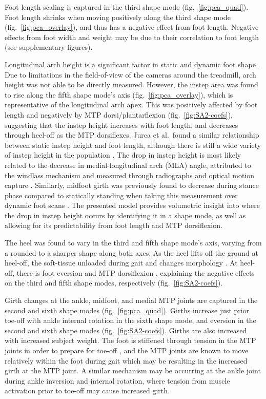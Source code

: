 \documentclass[defaultstyle,11pt]{thesis}
\begin{document}
Foot length scaling is captured in the third shape mode (fig.~\ref{fig:pca_quad}).
Foot length shrinks when moving positively along the third shape mode (fig.~\ref{fig:pca_overlay}), and thus has a negative effect from foot length.
Negative effects from foot width and weight may be due to their correlation to foot length (see supplementary figures).

Longitudinal arch height is a significant factor in static \citep{Stankovic2020, Conrad2019} and dynamic foot shape \citep{Schuster2021} .
Due to limitations in the field-of-view of the cameras around the treadmill, arch height was not able to be directly measured.
However, the instep area was found to rise along the fifth shape mode's axis (fig.~\ref{fig:pca_overlay}), which is representative of the longitudinal arch apex.
This was positively affected by foot length and negatively by MTP dorsi/plantarflexion (fig.~\ref{fig:SA2-coefs}), suggesting that the instep height increases with foot length, and decreases through heel-off as the MTP dorsiflexes.
Jurca et al.~found a similar relationship between static instep height and foot length, although there is still a wide variety of instep height in the population \citep{Jurca2019}.
The drop in instep height is most likely related to the decrease in medial-longitudinal arch (MLA) angle, attributed to the windlass mechanism and measured through radiographs and optical motion capture \citep{Hicks1954, Caravaggi2010, Stolwijk2014}.
Similarly, midfoot girth was previously found to decrease during stance phase compared to statically standing when taking this measurement over dynamic foot scans \citep{Grau2018}.
The presented model provides volumetric insight into where the drop in instep height occurs by identifying it in a shape mode, as well as allowing for its predictability from foot length and MTP dorsiflexion.

The heel was found to vary in the third and fifth shape mode's axis, varying from a rounded to a sharper shape along both axes.
As the heel lifts off the ground at heel-off, the soft-tissue unloaded during gait and changes morphology \citep{Fontanella2013}.
At heel-off, there is foot eversion and MTP dorsiflexion \citep{Leardini2007}, explaining the negative effects on the third and fifth shape modes, respectively (fig.~\ref{fig:SA2-coefs}).

Girth changes at the ankle, midfoot, and medial MTP joints are captured in the second and sixth shape modes (fig.~\ref{fig:pca_quad}).
Girths increase just prior toe-off with ankle internal rotation in the sixth shape mode, and eversion in the second and sixth shape modes (fig.~\ref{fig:SA2-coefs}).
Girths are also increased with increased subject weight.
The foot is stiffened through tension in the MTP joints in order to prepare for toe-off \citep{Hicks1954}, and the MTP joints are known to move relatively within the foot during gait \citep{Wolf2008, Lundgren2008} which may be resulting in the increased girth at the MTP joint.
A similar mechanism may be occurring at the ankle joint during ankle inversion and internal rotation, where tension from muscle activation prior to toe-off may cause increased girth.
\end{document}
